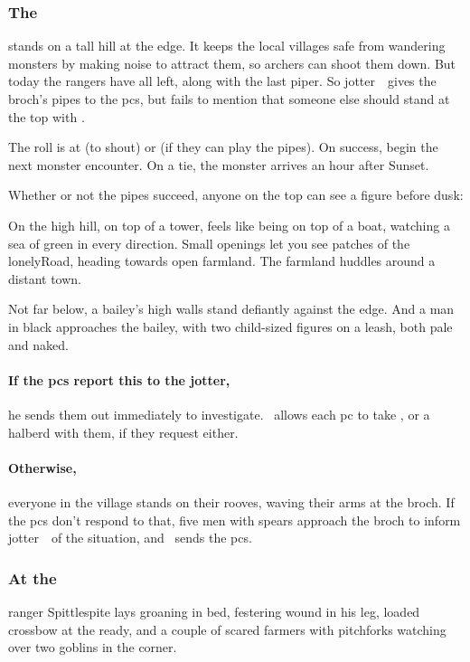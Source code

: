 \documentclass[10pt,twoside]{book}
\begin{document}
\subsubsection{The }
stands on a tall hill at the \gls{edge}.
It keeps the local \glspl{village} safe from wandering \glspl{monster} by making noise to attract them, so  archers can shoot them down.
But today the \glspl{ranger} have all left, along with the last piper.
So \Gls{jotter}~\fjot\ gives the \gls{broch}'s pipes to the \glspl{pc}, but fails to mention that someone else should stand at the top with .

The roll is  at \tn[12] (to shout) or \tn[9] (if they can play the pipes).
On success, begin the next \gls{monster} encounter.
On a tie, the \gls{monster} arrives an hour after Sunset.

Whether or not the pipes succeed, anyone on the top can see a figure before dusk:

\begin{boxtext}
  On the high hill, on top of a tower, feels like being on top of a boat, watching a  sea of green in every direction.
  Small openings let you see patches of the \gls{lonelyRoad}, heading towards open farmland.
  The farmland huddles around a distant town.
  
  Not far below, a bailey's high walls stand defiantly against the \gls{edge}.
  And a man in black approaches the bailey, with two child-sized figures on a leash, both pale and naked.
\end{boxtext}

\paragraph{If the \glspl{pc} report this to the \gls{jotter},}
he sends them out immediately to investigate.
\fjot\ allows each \gls{pc} to take \rations, or a halberd with them, if they request either.

\paragraph{Otherwise,}
everyone in the \gls{village} stands on their rooves, waving their arms at the \gls{broch}.
If the \glspl{pc} don't respond to that, five men with spears approach the \gls{broch} to inform \Gls{jotter}~\fjot\ of the situation, and \fjot\ sends the \glspl{pc}.

\subsubsection{At the }
\gls{ranger} Spittlespite lays groaning in bed, festering wound in his leg, loaded crossbow at the ready, and a couple of scared farmers with pitchforks watching over two goblins in the corner.
\end{document}
